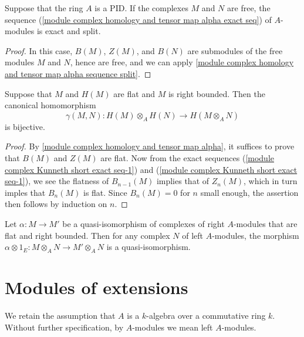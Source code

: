 \begin{corollary}
Suppose that the ring $A$ is a PID. If the complexes $M$ and $N$ are free, the sequence (\ref{module complex homology and tensor map alpha exact seq}) of $A$-modules is exact and split.
\end{corollary}
\begin{proof}
In this case, $B(M)$, $Z(M)$, and $B(N)$ are submodules of the free modules $M$ and $N$, hence are free, and we can apply \cref{module complex homology and tensor map alpha sequence split}.
\end{proof}
\begin{corollary}
Suppose that $M$ and $H(M)$ are flat and $M$ is right bounded. Then the canonical homomorphism
\[\gamma(M,N):H(M)\otimes_AH(N)\to H(M\otimes_AN)\]
is bijective.
\end{corollary}
\begin{proof}
By \cref{module complex homology and tensor map alpha}, it suffices to prove that $B(M)$ and $Z(M)$ are flat. Now from the exact sequences (\ref{module complex Kunneth short exact seq-1}) and (\ref{module complex Kunneth short exact seq-1}), we see the flatness of $B_{n-1}(M)$ implies that of $Z_n(M)$, which in turn imples that $B_{n}(M)$ is flat. Since $B_n(M)=0$ for $n$ small enough, the assertion then follows by induction on $n$.
\end{proof}
\begin{corollary}\label{module complex flat right bounded preserve quasi-iso}
Let $\alpha:M\to M'$ be a quasi-isomorphism of complexes of right $A$-modules that are flat and right bounded. Then for any complex $N$ of left $A$-modules, the morphism $\alpha\otimes 1_E:M\otimes_AN\to M'\otimes_AN$ is a quasi-isomorphism.
\end{corollary}
\section{Modules of extensions}
We retain the assumption that $A$ is a $k$-algebra over a commutative ring $k$. Without further specification, by $A$-modules we mean left $A$-modules.
